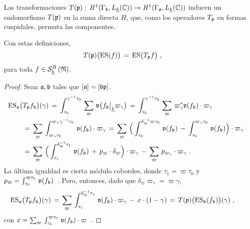 Las transformaciones
\begin{math}
	T(\frak{p}):\,\cohomolo[1]{\Gamma_{\frak{b}},L_{\peso{k}}(\bb{C})}
		\rightarrow
		\cohomolo[1]{\Gamma_{\frak{a}},L_{\peso{k}}(\bb{C})}
\end{math}
inducen un endomorfismo $T(\frak{p})$ en la suma directa $H$, que, como los
operadores $T_{\frak{p}}$ en formas cuspidales, permuta las componentes.

\begin{propoEichlerShimuraHeckeEquivariante}%
	\label{propo:eichlershimuraheckeequivariante}
	Con estas definiciones,
	\begin{align*}
		T(\frak{p})\big(\ES(f)\big) & \,=\,\ES\big(T_{\frak{p}}f\big)
		\text{ ,}
	\end{align*}
	para toda $f\in\spitzH[B]{k}{\frak{N}}$.
\end{propoEichlerShimuraHeckeEquivariante}

\begin{proof}
	Sean $\frak{a},\frak{b}$ tales que $[\frak{a}]=[\frak{b}\frak{p}]$.
	\begin{align*}
		& \ES_{\frak{a}}\big(T_{\frak{p}}f_{\frak{b}}\big)(\gamma)
			\,=\,
			\int_{\tau_{0}}^{\gamma^{-1}\tau_{0}}\,\sum_{\varpi}\,
			\frak{v}\big(f_{\frak{b}}\operadormatrices{\peso{k}}{%
				\varpi_{\gamma}}\big) \,=\,
			\int_{\tau_{0}}^{\gamma^{-1}\tau_{0}}\,\sum_{\varpi}\,
			\varpi_{\gamma}^{*}\frak{v}(f_{\frak{b}})\cdot
				\varpi_{\gamma} \\
		& \qquad\,=\,
			\sum_{\varpi}\,\int_{\varpi_{\gamma}\tau_{0}}^{%
			\varpi_{\gamma}\gamma^{-1}\tau_{0}}\,
			\frak{v}(f_{\frak{b}})\cdot\varpi_{\gamma} \,=\,
			\sum_{\varpi}\,\Big(
			\int_{\tau_{0}}^{\delta_{\varpi}^{-1}\varpi\tau_{0}}\,
				\frak{v}(f_{\frak{b}})\,-\,
			\int_{\tau_{0}}^{\varpi_{\gamma}\tau_{0}}\,
				\frak{v}(f_{\frak{b}})\Big)\cdot\varpi_{\gamma}
				\\
		& \qquad\,=\,
			\sum_{\varpi}\,\Big(
			\int_{\tau_{1}}^{\delta_{\varpi}^{-1}\tau_{1}}\,
				\frak{v}(f_{\frak{b}})\,+\,
				p_{\varpi}\cdot\delta_{\varpi}\Big)\cdot
					\varpi_{\gamma}\,-\,
			\sum_{\varpi}\,p_{\varpi_{\gamma}}\cdot\varpi_{\gamma}
		\text{ .}
	\end{align*}
	La \'{u}ltima igualdad es cierta m\'{o}dulo cobordes, donde
	$\tau_{1}=\varpi\tau_{0}$ y
	\begin{math}
		p_{\varpi}=\int_{\tau_{0}}^{\varpi\tau_{0}}\,
			\frak{v}(f_{\frak{b}})
	\end{math}~.
	Pero, entonces, dado que $\delta_{\varpi}\varpi_{\gamma}=\varpi\gamma$,
	\begin{align*}
		\ES_{\frak{a}}\big(T_{\frak{p}}f_{\frak{b}}\big)(\gamma)
			& \,=\,
		\sum_{\varpi}\,\int_{\tau_{1}}^{\delta_{\varpi}^{-1}\tau_{1}}\,
			\frak{v}(f_{\frak{b}})\cdot\varpi_{\gamma}\,-\,
			x\cdot(1-\gamma) \,=\,
			T(\frak{p})\big(\ES_{\frak{b}}(f_{\frak{b}})\big)
				(\gamma)
		\text{ ,}
	\end{align*}
	con
	\begin{math}
		x=\sum_{\varpi}\,\int_{\tau_{0}}^{\varpi\tau_{0}}\,
			\frak{v}(f_{\frak{b}})\cdot\varpi
	\end{math}~.
\end{proof}

